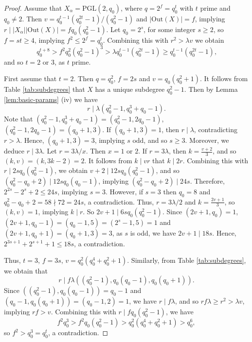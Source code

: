 \documentclass[a4paper,twopage,reqno,12pt]{amsart}
\theoremstyle{definition}
\numberwithin{equation}{section}
\newcommand{\PGL}{\mathrm{PGL}}
\newcommand{\Out}{\mathrm{Out}}
\begin{document}
\begin{proof}
Assume that $X_\alpha=\PGL(2,q_0)$, where $q=2^f=q_0^t$ with $t$ prime and $q_0\neq 2$.
Then $v=q_0^{t-1}(q_0^{2t}-1)/(q_0^2-1)$ and $|\Out(X)|=f$,
implying $r\mid |X_\alpha||\Out(X)|=fq_0(q_0^2-1)$.
Let $q_0=2^s$, for some integer $s\ge 2$, so $f=st\ge 4$,
implying $f^2\le 2^f=q_0^t$.
Combining this with $r^2 >\lambda v$
we obtain 
\[
q_0^{t+8}>f^2q_0^2(q_0^2-1)^3>\lambda q_0^{t-1}(q_0^{2t}-1)\ge q_0^{t-1}(q_0^{2t}-1)\text{,}    
\]
and so $t=2$ or 3, as $t$ prime.

First assume that $t=2$. 
Then $q=q_0^2$, $f=2s$ and $v=q_0(q_0^2+1)$. 
It follows from Table \ref{tab:subdegrees} that $X$ has a unique subdegree $q_0^2-1$.
Then by Lemma \ref{lem:basic-params} (iv) we have 
\[
r\mid \lambda (q_0^2-1,q_0^3+q_0-1).
\]
Note that $(q_0^2-1,q_0^3+q_0-1)=(q_0^2-1,2q_0-1)$,
$(q_0^2-1,2q_0-1)=(q_0+1,3)$.
If $(q_0+1,3)=1$, then $r\mid \lambda$, contradicting $r>\lambda$.
Hence, $(q_0+1,3)=3$, implying $s$ odd, and so $s\ge3$.
Moreover, we deduce $r\mid 3\lambda$.
Let $r=3\lambda/x$. Then $x=1$ or $2$.
If $r=3\lambda$, then $k=\frac{v+2}{3}$, and so $(k,v)=(k,3k-2)=2$.
It follows from $k\mid vr$ that $k\mid 2r$.
Combining this with $r\mid 2s q_0(q_0^2-1)$, we obtain $v+2\mid 12sq_0(q_0^2-1)$,
and so $(q_0^2-q_0+2)\mid 12sq_0(q_0-1)$, implying $(q_0^2-q_0+2)\mid 24s$.
Therefore, $2^{2s}-2^s+2\le 24s$,  implying $s=3$.
However, if $s=3$ then $q_0=8$ and $q_0^2-q_0+2=58\nmid72=24s$, a contradiction.
Thus, $r=3\lambda/2$ and $k=\frac{2v+1}{3}$, so $(k,v)=1$, implying $k\mid r$.
So $2v+1\mid 6sq_0(q_0^2-1)$.
Since $(2v+1,q_0)=1$, $(2v+1,q_0-1)=(q_0-1,5)=(2^s-1,5)=1$ 
and $(2v+1,q_0+1)=(q_0+1,3)=3$, as $s$ is odd,
we have $2v+1\mid 18s$.
Hence, $2^{3s+1}+2^{s+1}+1 \le 18s$, a contradiction. 

Thus, $t=3$, $f=3s$, $v=q_0^2(q_0^4+q_0^2+1)$.
Similarly, from Table \ref{tab:subdegrees}, we obtain that
\[
 r\mid f\lambda \left((q_0^2-1), q_0(q_0-1), q_0(q_0+1)\right).
\]
Since $((q_0^2-1), q_0(q_0-1))=q_0-1$ and $(q_0-1,q_0(q_0+1))=(q_0-1,2)=1$,
we have $r\mid f\lambda$, and so $rf\lambda\ge r^2>\lambda v$, implying $rf>v$.
Combining this with $r\mid fq_0(q_0^2-1)$,
we have 
\[
f^2q_0^3>f^2q_0(q_0^2-1)>q_0^2(q_0^4+q_0^2+1)>q_0^6,
\]
so $f^2>q_0^3=q_0^{t}$, a contradiction.
\end{proof}
\end{document}
